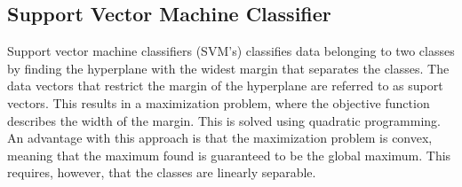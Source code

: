 \subsection{Support Vector Machine Classifier}
Support vector machine classifiers (SVM's) classifies data belonging to two classes by finding the hyperplane with the widest margin that separates the classes. The data vectors that restrict the margin of the hyperplane are referred to as suport vectors. This results in a maximization problem, where the objective function describes the width of the margin. This is solved using quadratic programming. An advantage with this approach is that the maximization problem is convex, meaning that the maximum found is guaranteed to be the global maximum. This requires, however, that the classes are linearly separable.